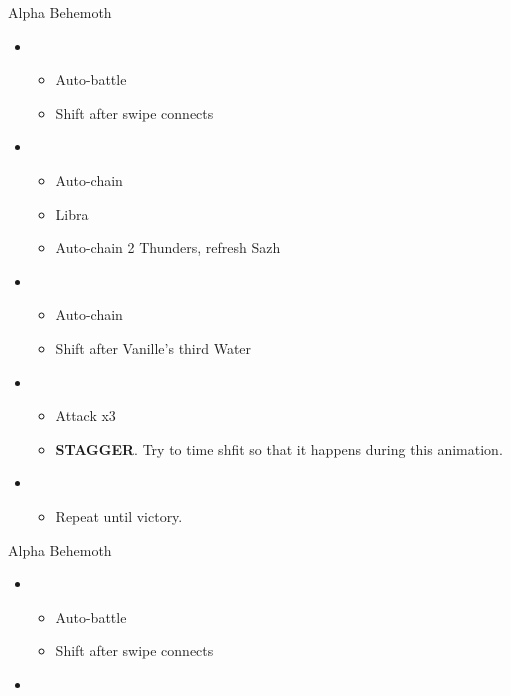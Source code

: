\begin{paracol}{2}
	\begin{battle}{Alpha Behemoth}
		\begin{itemize}
			\item \first
			      \begin{itemize}
				      \item Auto-battle
				      \item Shift after swipe connects
			      \end{itemize}
			\item \third
			      \begin{itemize}
				      \item Auto-chain
				      \item Libra
				      \item Auto-chain 2 Thunders, refresh Sazh
			      \end{itemize}
			\item \fourth
			      \begin{itemize}
				      \item Auto-chain
				      \item Shift after Vanille's third Water
			      \end{itemize}
			\item \first
			      \begin{itemize}
				      \item Attack x3
				      \item \textbf{STAGGER}. Try to time shfit so that it happens during this animation.
			      \end{itemize}
			\item \fifth
			      \begin{itemize}
				      \item Repeat until victory.
			      \end{itemize}
		\end{itemize}
	\end{battle}
	\switchcolumn
	\begin{battle}{Alpha Behemoth}
		\begin{itemize}
			\item \first
			      \begin{itemize}
				      \item Auto-battle
				      \item Shift after swipe connects
			      \end{itemize}
			\item \third
			      \begin{itemize}

\end{itemize}
\end{itemize}
\end{battle}
\end{paracol}

